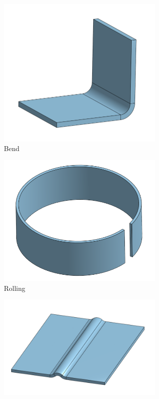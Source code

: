 \documentclass[10pt,letterpaper]{book}
\begin{document}
 	\begin{figure}[H]
		\centering
		\begin{subfigure}[b]{.24\linewidth}
			\includegraphics[width=0.9\textwidth]{imgs/sheet_bend.png}
			\caption{Bend}
		\end{subfigure}\begin{subfigure}[b]{.24\linewidth}
			\includegraphics[width=0.9\textwidth]{imgs/sheet_roll.png}
			\caption{Rolling}
		\end{subfigure}\begin{subfigure}[b]{.24\linewidth}
			\includegraphics[width=0.9\textwidth]{imgs/sheet_beadroll.png}

\end{subfigure}
\end{figure}
\end{document}
